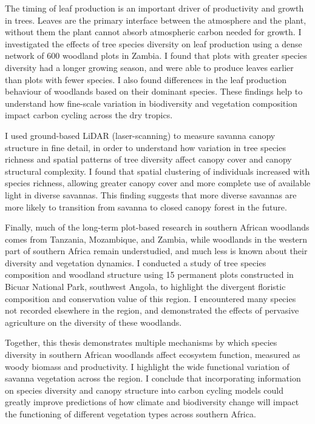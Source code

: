The timing of leaf production is an important driver of productivity and growth in trees. Leaves are the primary interface between the atmosphere and the plant, without them the plant cannot absorb atmospheric carbon needed for growth. I investigated the effects of tree species diversity on leaf production using a dense network of \textapprox{}600 woodland plots in Zambia. I found that plots with greater species diversity had a longer growing season, and were able to produce leaves earlier than plots with fewer species. I also found differences in the leaf production behaviour of woodlands based on their dominant species. These findings help to understand how fine-scale variation in biodiversity and vegetation composition impact carbon cycling across the dry tropics.

I used ground-based LiDAR (laser-scanning) to measure savanna canopy structure in fine detail, in order to understand how variation in tree species richness and spatial patterns of tree diversity affect canopy cover and canopy structural complexity. I found that spatial clustering of individuals increased with species richness, allowing greater canopy cover and more complete use of available light in diverse savannas. This finding suggests that more diverse savannas are more likely to transition from savanna to closed canopy forest in the future.

Finally, much of the long-term plot-based research in southern African woodlands comes from Tanzania, Mozambique, and Zambia, while woodlands in the western part of southern Africa remain understudied, and much less is known about their diversity and vegetation dynamics. I conducted a study of tree species composition and woodland structure using 15 permanent plots constructed in Bicuar National Park, southwest Angola, to highlight the divergent floristic composition and conservation value of this region. I encountered many species not recorded elsewhere in the region, and demonstrated the effects of pervasive agriculture on the diversity of these woodlands. 

Together, this thesis demonstrates multiple mechanisms by which species diversity in southern African woodlands affect ecosystem function, measured as woody biomass and productivity. I highlight the wide functional variation of savanna vegetation across the region. I conclude that incorporating information on species diversity and canopy structure into carbon cycling models could greatly improve predictions of how climate and biodiversity change will impact the functioning of different vegetation types across southern Africa. 
